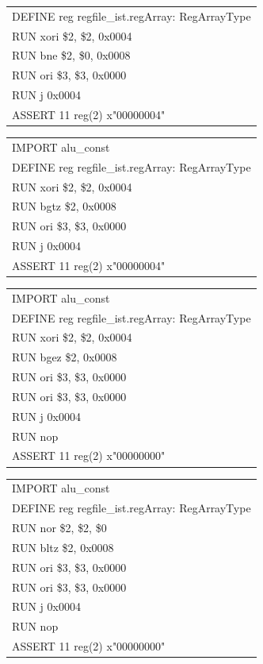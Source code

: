 \documentclass[11pt,utf8]{article}
\begin{document}
{{{{\begin{center}
\begin{longtable}{p{15cm}}
		DEFINE{ }reg{ }regfile\_ist.regArray:{ }RegArrayType\\
		RUN{ }xori{ }\$2,{ }\$2,{ }0x0004\\
		RUN{ }bne{ }\$2,{ }\$0,{ }0x0008\\
		RUN{ }ori{ }\$3,{ }\$3,{ }0x0000\\
		RUN{ }j{ }0x0004\\
		ASSERT{ }11{ }reg(2){ }x"00000004"\\
		\hline \end{longtable} \end{center}
\begin{center}	\begin{longtable}{p{15cm}} \hline
		IMPORT{ }alu\_const\\
		DEFINE{ }reg{ }regfile\_ist.regArray:{ }RegArrayType\\
		RUN{ }xori{ }\$2,{ }\$2,{ }0x0004\\
		RUN{ }bgtz{ }\$2,{ }0x0008\\
		RUN{ }ori{ }\$3,{ }\$3,{ }0x0000\\
		RUN{ }j{ }0x0004\\
		ASSERT{ }11{ }reg(2){ }x"00000004"\\
		\hline \end{longtable} \end{center}
\begin{center}	\begin{longtable}{p{15cm}} \hline
		IMPORT{ }alu\_const\\
		DEFINE{ }reg{ }regfile\_ist.regArray:{ }RegArrayType\\
		RUN{ }xori{ }\$2,{ }\$2,{ }0x0004\\
		RUN{ }bgez{ }\$2,{ }0x0008\\
		RUN{ }ori{ }\$3,{ }\$3,{ }0x0000\\
		RUN{ }ori{ }\$3,{ }\$3,{ }0x0000\\
		RUN{ }j{ }0x0004\\
		RUN{ }nop\\
		ASSERT{ }11{ }reg(2){ }x"00000000"\\
		\hline \end{longtable} \end{center}
\begin{center}	\begin{longtable}{p{15cm}} \hline
		IMPORT{ }alu\_const\\
		DEFINE{ }reg{ }regfile\_ist.regArray:{ }RegArrayType\\
		RUN{ }nor{ }\$2,{ }\$2,{ }\$0\\
		RUN{ }bltz{ }\$2,{ }0x0008\\
		RUN{ }ori{ }\$3,{ }\$3,{ }0x0000\\
		RUN{ }ori{ }\$3,{ }\$3,{ }0x0000\\
		RUN{ }j{ }0x0004\\
		RUN{ }nop\\
		ASSERT{ }11{ }reg(2){ }x"00000000"\\
		\hline \end{longtable} \end{center}
}
}

}}
\end{document}

